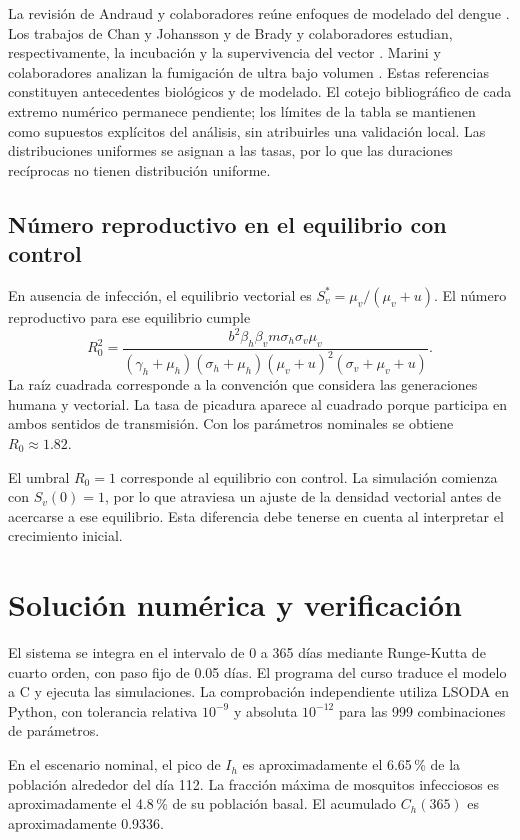 \documentclass[12pt,spanish,oneside,openany]{MastersDoctoralThesis}
\numberwithin{equation}{section}
\begin{document}
La revisión de Andraud y colaboradores reúne enfoques de modelado del dengue \cite{andraud}. Los trabajos de Chan y Johansson y de Brady y colaboradores estudian, respectivamente, la incubación y la supervivencia del vector \cite{chan,brady}. Marini y colaboradores analizan la fumigación de ultra bajo volumen \cite{marini}. Estas referencias constituyen antecedentes biológicos y de modelado. El cotejo bibliográfico de cada extremo numérico permanece pendiente; los límites de la tabla se mantienen como supuestos explícitos del análisis, sin atribuirles una validación local. Las distribuciones uniformes se asignan a las tasas, por lo que las duraciones recíprocas no tienen distribución uniforme.

\subsection{Número reproductivo en el equilibrio con control}
En ausencia de infección, el equilibrio vectorial es $S_v^*=\mu_v/(\mu_v+u)$. El número reproductivo para ese equilibrio cumple
\begin{equation}\label{eq:r0}
R_0^2=
\frac{b^2\beta_h\beta_vm\sigma_h\sigma_v\mu_v}
{(\gamma_h+\mu_h)(\sigma_h+\mu_h)(\mu_v+u)^2(\sigma_v+\mu_v+u)}.
\end{equation}
La raíz cuadrada corresponde a la convención que considera las generaciones humana y vectorial. La tasa de picadura aparece al cuadrado porque participa en ambos sentidos de transmisión. Con los parámetros nominales se obtiene $R_0\approx1.82$.

El umbral $R_0=1$ corresponde al equilibrio con control. La simulación comienza con $S_v(0)=1$, por lo que atraviesa un ajuste de la densidad vectorial antes de acercarse a ese equilibrio. Esta diferencia debe tenerse en cuenta al interpretar el crecimiento inicial.

\section{Solución numérica y verificación}
El sistema se integra en el intervalo de 0 a 365 días mediante Runge-Kutta de cuarto orden, con paso fijo de 0.05 días. El programa del curso traduce el modelo a C y ejecuta las simulaciones. La comprobación independiente utiliza LSODA en Python, con tolerancia relativa $10^{-9}$ y absoluta $10^{-12}$ para las 999 combinaciones de parámetros.

En el escenario nominal, el pico de $I_h$ es aproximadamente el 6.65\,\% de la población alrededor del día 112. La fracción máxima de mosquitos infecciosos es aproximadamente el 4.8\,\% de su población basal. El acumulado $C_h(365)$ es aproximadamente 0.9336.
\end{document}
